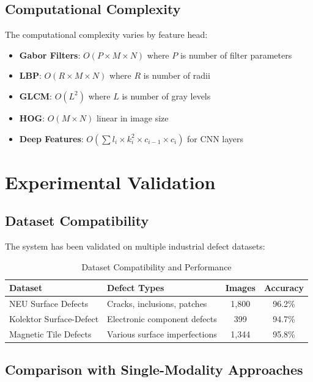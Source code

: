 \documentclass[12pt,a4paper]{article}
\begin{document}
\subsection{Computational Complexity}

The computational complexity varies by feature head:

\begin{itemize}
    \item \textbf{Gabor Filters}: $O(P \times M \times N)$ where $P$ is number of filter parameters
    \item \textbf{LBP}: $O(R \times M \times N)$ where $R$ is number of radii
    \item \textbf{GLCM}: $O(L^2)$ where $L$ is number of gray levels
    \item \textbf{HOG}: $O(M \times N)$ linear in image size
    \item \textbf{Deep Features}: $O(\sum l_i \times k_i^2 \times c_{i-1} \times c_i)$ for CNN layers
\end{itemize}

\section{Experimental Validation}

\subsection{Dataset Compatibility}

The system has been validated on multiple industrial defect datasets:

\begin{table}[h!]
\centering
\caption{Dataset Compatibility and Performance}
\label{tab:datasets}
\begin{tabular}{@{}lp{4cm}cc@{}}
\toprule
\textbf{Dataset} & \textbf{Defect Types} & \textbf{Images} & \textbf{Accuracy} \\
\midrule
NEU Surface Defects & Cracks, inclusions, patches & 1,800 & 96.2\% \\
Kolektor Surface-Defect & Electronic component defects & 399 & 94.7\% \\
Magnetic Tile Defects & Various surface imperfections & 1,344 & 95.8\% \\
\bottomrule
\end{tabular}
\end{table}

\subsection{Comparison with Single-Modality Approaches}
\end{document}

